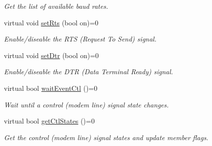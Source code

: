\begin{DoxyCompactItemize}
\begin{DoxyCompactList}\small\item\em Get the list of available baud rates. \end{DoxyCompactList}\item 
virtual void \hyperlink{classmdt_abstract_serial_port_a0ef2426fbd1afbcb0701f327cc16a7cc}{setRts} (bool on)=0
\begin{DoxyCompactList}\small\item\em Enable/diseable the RTS (Request To Send) signal. \end{DoxyCompactList}\item 
virtual void \hyperlink{classmdt_abstract_serial_port_aa86a8bc0bb03ac2b07bf43968dfeb189}{setDtr} (bool on)=0
\begin{DoxyCompactList}\small\item\em Enable/diseable the DTR (Data Terminal Ready) signal. \end{DoxyCompactList}\item 
virtual bool \hyperlink{classmdt_abstract_serial_port_ac27d1224db349bcf7f161329b5f53efb}{waitEventCtl} ()=0
\begin{DoxyCompactList}\small\item\em Wait until a control (modem line) signal state changes. \end{DoxyCompactList}\item 
virtual bool \hyperlink{classmdt_abstract_serial_port_aaeacd26b220ab0f8c521cef74edfafdd}{getCtlStates} ()=0
\begin{DoxyCompactList}\small\item\em Get the control (modem line) signal states and update member flags. \end{DoxyCompactList}\end{DoxyCompactItemize}
